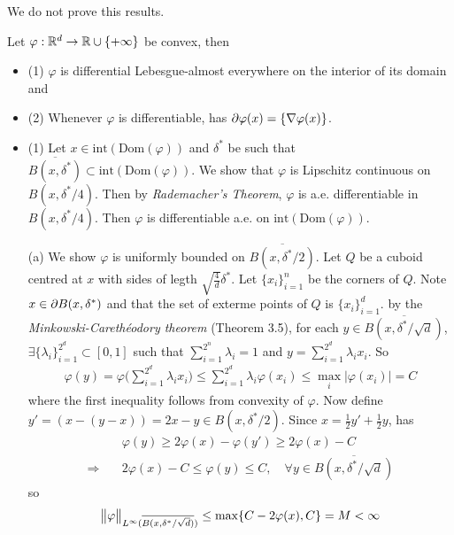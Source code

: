 \documentclass[12pt,a4paper]{article}
\newenvironment{proof}
{\begin{changemargin}{1cm}{0.5cm} 
	}%
	{\end{changemargin}
}
\renewenvironment{i}
{\begin{itemize} 
	}%
	{\end{itemize}
}
\newenvironment{p}
{\begin{proof} 
	}%
	{\end{proof}
}
\begin{document}
\quad We do not prove this results.
\s

 Let $\varphi : \mathbb{R}^d \rightarrow \mathbb{R} \cup \{+\infty \}$ be convex, then
\begin{i}
\item[(1)] $\varphi$ is differential Lebesgue-almost everywhere on the interior of its domain and
\item[(2)] Whenever $\varphi$ is differentiable, has $\partial \varphi(x) = \{\nabla \varphi(x) \}$.
\end{i}
\begin{p}
\pf \begin{i}
\item[(1)] Let $x\in \text{int}(\text{Dom}(\varphi))$ and $\delta^*$ be such that $\overline{B(x, \delta^*)} \subset \text{int}(\text{Dom}(\varphi))$. We show that $\varphi$ is Lipschitz continuous on $B(x, \delta^*/4)$. Then by \emph{Rademacher's Theorem}, $\varphi$ is a.e. differentiable in $B(x, \delta^*/4)$. Then $\varphi$ is differentiable a.e. on $\text{int}(\text{Dom}(\varphi))$.

(a) We show $\varphi$ is uniformly bounded on $\overline{B(x, \delta^*/2)}$. Let $Q$ be a cuboid centred at $x$ with sides of legth $\sqrt{\frac{4}{d}} \delta^*$. Let $\{x_i\}_{i=1}^n$ be the corners of $Q$. Note $x\in \partial B(x, \delta^*)$ and that the set of exterme points of $Q$ is $\{x_i \}_{i=1}^d$. by the \emph{Minkowski-Careth\'{e}odory theorem} (Theorem 3.5), for each $y \in \overline{B(x, \delta^*/\sqrt{d})}$, $\exists \{\lambda_i \}_{i=1}^{2^d} \subset [0,1]$ such that $\sum_{i=1}^{2^n} \lambda_i =1$ and $y = \sum_{i=1}^{2^d} \lambda_i x_i$. So
\begin{align*}
\varphi(y) = \varphi \big( \sum_{i=1}^{2^d} \lambda_i x_i \big) \leq \sum_{i=1}^{2^d} \lambda_i \varphi(x_i) \leq \max_{i} |\varphi(x_i)| =C
\end{align*}
where the first inequality follows from convexity of $\varphi$. Now define $y' = (x-(y-x)) = 2x-y \in B(x, \delta^*/2)$. Since $x= \frac{1}{2} y' + \frac{1}{2}y$, has
\begin{align*}
& \varphi(y) \geq 2\varphi(x) - \varphi(y') \geq 2\varphi(x) - C  \\
\Rightarrow \quad & 2\varphi(x) - C \leq \varphi(y) \leq C, \quad \forall y\in \overline{B(x, \delta^*/\sqrt{d} )}
\end{align*}
so 
\begin{align*}
\bigl\lVert\varphi\bigr\rVert_{L^{\infty}(\overline{B(x, \delta^*/\sqrt{d})})} \leq \max \{C- 2\varphi(x), C\} = M < \infty
\end{align*}


\end{i}
\end{p}
\end{document}
